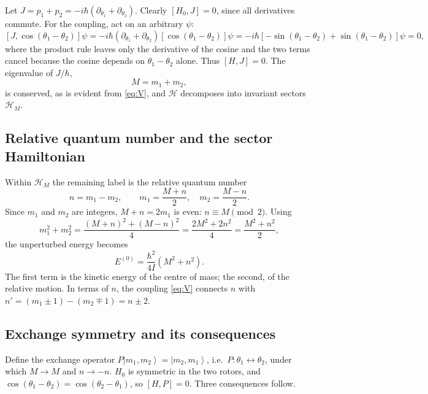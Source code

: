 \documentclass[preprint,12pt]{elsarticle}
\newcommand{\ket}[1]{\left|#1\right\rangle}
\begin{document}
Let $J=p_{1}+p_{2}=-i\hbar(\partial_{\theta_{1}}+\partial_{\theta_{2}})$.
Clearly $[H_{0},J]=0$, since all derivatives commute. For the coupling, act on
an arbitrary $\psi$:
\begin{equation}
\left[J,\cos(\theta_{1}-\theta_{2})\right]\psi
=-i\hbar\left(\partial_{\theta_{1}}+\partial_{\theta_{2}}\right)
\left[\cos(\theta_{1}-\theta_{2})\right]\psi
=-i\hbar\left[-\sin(\theta_{1}-\theta_{2})+\sin(\theta_{1}-\theta_{2})\right]\psi
=0,
\end{equation}
where the product rule leaves only the derivative of the cosine and the two
terms cancel because the cosine depends on $\theta_{1}-\theta_{2}$ alone. Thus
$[H,J]=0$. The eigenvalue of $J/\hbar$,
\begin{equation}
M=m_{1}+m_{2},
\label{eq:M}
\end{equation}
is conserved, as is evident from \eqref{eq:V}, and $\mathcal{H}$ decomposes into
invariant sectors $\mathcal{H}_{M}$.

\subsection{Relative quantum number and the sector Hamiltonian}

Within $\mathcal{H}_{M}$ the remaining label is the relative quantum number
\begin{equation}
n=m_{1}-m_{2},\qquad
m_{1}=\frac{M+n}{2},\quad m_{2}=\frac{M-n}{2}.
\label{eq:nrel}
\end{equation}
Since $m_{1}$ and $m_{2}$ are integers, $M+n=2m_{1}$ is even: $n\equiv M\pmod 2$.
Using
\begin{equation}
m_{1}^{2}+m_{2}^{2}=\frac{(M+n)^{2}+(M-n)^{2}}{4}
=\frac{2M^{2}+2n^{2}}{4}=\frac{M^{2}+n^{2}}{2},
\end{equation}
the unperturbed energy becomes
\begin{equation}
E^{(0)}=\frac{\hbar^{2}}{4I}\left(M^{2}+n^{2}\right).
\label{eq:E0n}
\end{equation}
The first term is the kinetic energy of the centre of mass; the second, of the
relative motion. In terms of $n$, the coupling \eqref{eq:V} connects $n$ with
$n'=(m_{1}\pm1)-(m_{2}\mp1)=n\pm2$.

\subsection{Exchange symmetry and its consequences}
\label{sec:exchange}

Define the exchange operator $P\ket{m_{1},m_{2}}=\ket{m_{2},m_{1}}$, i.e.\
$P:\theta_{1}\leftrightarrow\theta_{2}$, under which $M\to M$ and $n\to-n$.
$H_{0}$ is symmetric in the two rotors, and
$\cos(\theta_{1}-\theta_{2})=\cos(\theta_{2}-\theta_{1})$, so $[H,P]=0$.
Three consequences follow.
\end{document}

